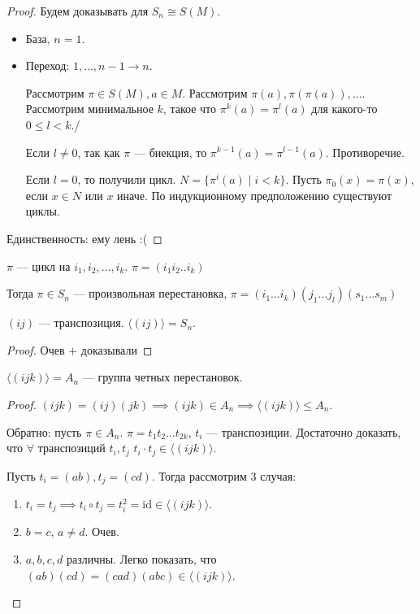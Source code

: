 \begin{proof}
    Будем доказывать для $S_n \cong S(M)$.

     \begin{itemize}
         \item База, $n = 1$.
         \item Переход: $1,\ldots, n-1 \to n$.

             Рассмотрим $\pi \in S(M), a \in M$. Рассмотрим  $\pi(a), \pi(\pi(a)), \ldots$. Рассмотрим минимальное $k$, такое что  $\pi^k(a) = \pi^l(a)$ для какого-то  $0 \le l < k$./

             Если $l \neq 0$, так как  $\pi$ --- биекция, то  $\pi^{k-1}(a) = \pi^{l-1}(a)$. Противоречие.

             Если  $l = 0$, то получили цикл.  $N = \{ \pi^{i}(a) \mid i < k \}$. Пусть  $\pi_0(x) = \pi(x)$, если  $x \in N$ или  $x$ иначе. По индукционному предположению существуют циклы.
    \end{itemize}

    Единственность: ему лень :(
\end{proof}

\begin{definition}
    $\pi$ --- цикл на  $i_1, i_2, \ldots, i_k$. $\pi = (i_1 i_2..i_k)$

    Тогда $\pi \in S_n$ --- произвольная перестановка,  $\pi = (i_1 \ldots i_k)(j_1 \ldots j_l) (s_1 \ldots s_m)$
\end{definition}

\begin{theorem}
    $(ij)$ --- транспозиция. $\langle (ij) \rangle = S_n$.
\end{theorem}
\begin{proof}
    Очев $+$ доказывали
\end{proof}
\begin{theorem}
    $\langle (ijk) \rangle = A_n$ --- группа четных перестановок.
\end{theorem}
\begin{proof}
    $(ijk) = (ij)(jk) \implies (ijk) \in A_n \implies \langle (ijk) \rangle \le A_n$.

    Обратно: пусть $\pi \in A_n$.  $\pi = t_1t_2\ldots t_{2k}$, $t_i$ --- транспозиции. Достаточно доказать, что  $\forall $ транспозиций  $t_i, t_j$  $t_i \cdot t_j \in \langle (ijk)\rangle$.

    Пусть  $t_i = (ab), t_j = (cd)$. Тогда рассмотрим 3 случая:
     \begin{enumerate}
         \item $t_i = t_j \implies t_i \circ t_j = t_i^2 = \mathrm{id} \in \langle (ijk) \rangle$.
         \item  $b = c$,  $a \neq d$. Очев.
         \item $a, b, c, d$ различны. Легко показать, что  $(ab)(cd) = (cad)(abc) \in \langle (ijk) \rangle$.
    \end{enumerate}
\end{proof}


